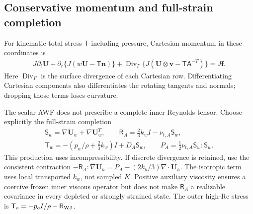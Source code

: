 \documentclass[11pt,a4paper]{article}
\numberwithin{equation}{section}
\begin{document}
\subsection{Conservative momentum and full-strain completion}
For kinematic total stress $\mathsf T$ including pressure, Cartesian
momentum in these coordinates is
\begin{equation}
 \begin{aligned}
 J\partial_t\bm U+\partial_r\{J(w\bm U-\mathsf T\bm n)\}
 +\operatorname{Div}_\Gamma
 \{J(\bm U\otimes\bm v-\mathsf T\mathsf A^{-T})\}
 =J\bm f.
 \end{aligned}
 \label{eq:wj-wall-curved-momentum}
\end{equation}
Here $\operatorname{Div}_\Gamma$ is the surface divergence of each
Cartesian row. Differentiating Cartesian components also differentiates
the rotating tangents and normals; dropping those terms loses curvature.

The scalar AWF does not prescribe a complete inner Reynolds tensor.
Choose explicitly the full-strain completion
\begin{equation}
 \begin{gathered}
 \mathsf S_w=\nabla\bm U_w+\nabla\bm U_w^T,\qquad
 \mathsf R_A=\tfrac23 k_w I-\nu_{t,A}\mathsf S_w,\\
 \mathsf T_w=-\left(p_w/\rho+\tfrac23k_w\right)I+D_A\mathsf S_w,
 \qquad P_A=\tfrac12\nu_{t,A}\mathsf S_w:\mathsf S_w.
 \end{gathered}
 \label{eq:wj-wall-inner-stress}
\end{equation}
This production uses incompressibility. If discrete divergence is retained,
use the consistent contraction
$-\mathsf R_A:\nabla\bm U_h=P_A-(2k_h/3)\nabla\cdot\bm U_h$.
The isotropic term uses local transported $k_w$, not sampled $K$.
Positive auxiliary viscosity ensures a coercive frozen inner viscous
operator but does not make $\mathsf R_A$ a realizable covariance in
every depleted or strongly strained state. The outer high-Re stress is
$\mathsf T_o=-p_oI/\rho-\mathsf R_{\rm WJ}$.
\end{document}
